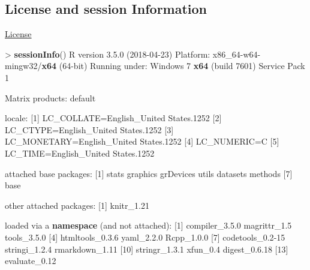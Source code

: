 \documentclass[]{article}
\newenvironment{Shaded}{\begin{snugshade}}{\end{snugshade}}
\newcommand{\KeywordTok}[1]{\textcolor[rgb]{0.13,0.29,0.53}{\textbf{{#1}}}}
\newcommand{\DecValTok}[1]{\textcolor[rgb]{0.00,0.00,0.81}{{#1}}}
\newcommand{\FloatTok}[1]{\textcolor[rgb]{0.00,0.00,0.81}{{#1}}}
\newcommand{\StringTok}[1]{\textcolor[rgb]{0.31,0.60,0.02}{{#1}}}
\newcommand{\NormalTok}[1]{{#1}}
\begin{document}
\subsection{License and session
Information}\label{license-and-session-information}

\href{http://math.wsu.edu/faculty/xchen/stat412/LICENSE.html}{License}

\begin{Shaded}
\begin{Highlighting}[]
\NormalTok{>}\StringTok{ }\KeywordTok{sessionInfo}\NormalTok{()}
\NormalTok{R version }\FloatTok{3.5.0} \NormalTok{(}\DecValTok{2018-04-23}\NormalTok{)}
\NormalTok{Platform:}\StringTok{ }\NormalTok{x86_64-w64-mingw32/}\KeywordTok{x64} \NormalTok{(}\DecValTok{64}\NormalTok{-bit)}
\NormalTok{Running under:}\StringTok{ }\NormalTok{Windows }\DecValTok{7} \KeywordTok{x64} \NormalTok{(build }\DecValTok{7601}\NormalTok{) Service Pack }\DecValTok{1}

\NormalTok{Matrix products:}\StringTok{ }\NormalTok{default}

\NormalTok{locale:}
\NormalTok{[}\DecValTok{1}\NormalTok{] LC_COLLATE=English_United States}\FloatTok{.1252} 
\NormalTok{[}\DecValTok{2}\NormalTok{] LC_CTYPE=English_United States}\FloatTok{.1252}   
\NormalTok{[}\DecValTok{3}\NormalTok{] LC_MONETARY=English_United States}\FloatTok{.1252}
\NormalTok{[}\DecValTok{4}\NormalTok{] LC_NUMERIC=C                          }
\NormalTok{[}\DecValTok{5}\NormalTok{] LC_TIME=English_United States}\FloatTok{.1252}    

\NormalTok{attached base packages:}
\NormalTok{[}\DecValTok{1}\NormalTok{] stats     graphics  grDevices utils     datasets  methods  }
\NormalTok{[}\DecValTok{7}\NormalTok{] base     }

\NormalTok{other attached packages:}
\NormalTok{[}\DecValTok{1}\NormalTok{] knitr_1}\FloatTok{.21}

\NormalTok{loaded via a }\KeywordTok{namespace} \NormalTok{(and not attached):}
\StringTok{ }\NormalTok{[}\DecValTok{1}\NormalTok{] compiler_3}\FloatTok{.5.0}   \NormalTok{magrittr_1}\FloatTok{.5}     \NormalTok{tools_3}\FloatTok{.5.0}     
 \NormalTok{[}\DecValTok{4}\NormalTok{] htmltools_0}\FloatTok{.3.6}  \NormalTok{yaml_2}\FloatTok{.2.0}       \NormalTok{Rcpp_1}\FloatTok{.0.0}      
 \NormalTok{[}\DecValTok{7}\NormalTok{] codetools_0}\FloatTok{.2}\DecValTok{-15} \NormalTok{stringi_1}\FloatTok{.2.4}    \NormalTok{rmarkdown_1}\FloatTok{.11}  
\NormalTok{[}\DecValTok{10}\NormalTok{] stringr_1}\FloatTok{.3.1}    \NormalTok{xfun_0}\FloatTok{.4}         \NormalTok{digest_0}\FloatTok{.6.18}   
\NormalTok{[}\DecValTok{13}\NormalTok{] evaluate_0}\FloatTok{.12}   
\end{Highlighting}
\end{Shaded}
\end{document}
